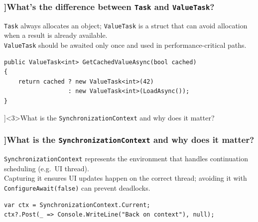 \begin{frame}[fragile]
  \frametitle{\AnswerTitle[\CategoryBadge[OOPColor!20]{C\#} ]{What's the difference between \texttt{Task} and \texttt{ValueTask}?}}

  {\footnotesize
  \texttt{Task} always allocates an object; \texttt{ValueTask} is a struct that can avoid allocation when a result is already available.\\
  \texttt{ValueTask} should be awaited only once and used in performance-critical paths.
  }

  \begin{verbatim}
public ValueTask<int> GetCachedValueAsync(bool cached)
{
    return cached ? new ValueTask<int>(42)
                  : new ValueTask<int>(LoadAsync());
}
  \end{verbatim}
\end{frame}

\QuestionSlide[\CategoryBadge[PerfColor!20]{Async \& Threading}]<3>{What is the \texttt{SynchronizationContext} and why does it matter?}

\begin{frame}[fragile]
  \frametitle{\AnswerTitle[\CategoryBadge[OOPColor!20]{C\#} ]{What is the \texttt{SynchronizationContext} and why does it matter?}}

  {\footnotesize
  \texttt{SynchronizationContext} represents the environment that handles continuation scheduling (e.g.\ UI thread).\\
  Capturing it ensures UI updates happen on the correct thread; avoiding it with \texttt{ConfigureAwait(false)} can prevent deadlocks.
  }

  \begin{verbatim}
var ctx = SynchronizationContext.Current;
ctx?.Post(_ => Console.WriteLine("Back on context"), null);
  \end{verbatim}
\end{frame}
